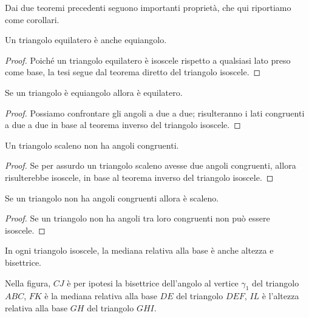Dai due teoremi precedenti seguono importanti proprietà, che qui 
riportiamo come corollari.

\begin{corollario}
Un triangolo equilatero è anche equiangolo.
\end{corollario}

\begin{proof}
Poiché un triangolo equilatero è isoscele rispetto a qualsiasi lato 
preso come base, la tesi segue dal teorema diretto del triangolo 
isoscele.
\end{proof}

\begin{corollario}
Se un triangolo è equiangolo allora è equilatero.
\end{corollario}

\begin{proof}
Possiamo confrontare gli angoli a due a due; risulteranno i lati 
congruenti a due a due in base al teorema inverso del triangolo 
isoscele.
\end{proof}

\begin{corollario}
Un triangolo scaleno non ha angoli congruenti.
\end{corollario}

\begin{proof}
Se per assurdo un triangolo scaleno avesse due angoli congruenti, 
allora risulterebbe isoscele, in base al teorema inverso del 
triangolo isoscele.
\end{proof}

\begin{corollario}
Se un triangolo non ha angoli congruenti allora è scaleno.
\end{corollario}

\begin{proof}
Se un triangolo non ha angoli tra loro congruenti non può essere 
isoscele.
\end{proof}

\begin{proposizione}
In ogni triangolo isoscele, la mediana relativa alla base è anche 
altezza e bisettrice.
\end{proposizione}
Nella figura, $CJ$ è per ipotesi la bisettrice dell'angolo al vertice 
$\gamma_1$ del triangolo $ABC$, $FK$ è la mediana relativa alla base 
$DE$ del triangolo $DEF$, $IL$ è l'altezza relativa alla base $GH$ 
del triangolo $GHI$.


\begin{inaccessibleblock}
 \begin{figure}[htb]
\centering
\end{figure}
\end{inaccessibleblock}


